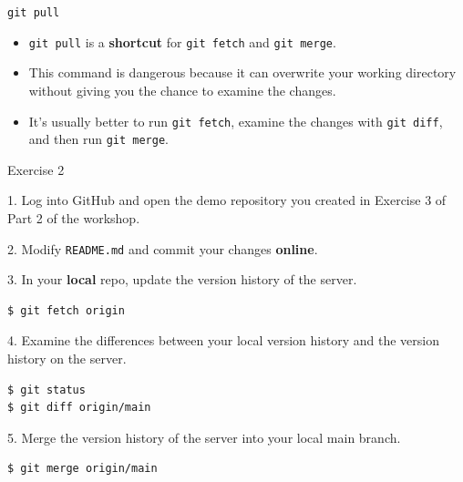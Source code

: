 \documentclass[handout]{beamer}
\begin{document}
\begin{frame}{\texttt{git pull}}
\begin{itemize}
	\item \texttt{git pull} is a \textbf{shortcut} for \texttt{git fetch} and \texttt{git merge}.
	\item This command is \alert{dangerous} because it can overwrite your working directory without giving you the chance to examine the changes. 
	\item It's usually better to run \texttt{git fetch}, examine the changes with \texttt{git diff}, and then run \texttt{git merge}.
\end{itemize}
\end{frame}


\begin{frame}[fragile]{Exercise 2}

1. Log into GitHub and open the demo repository you created in Exercise 3 of Part 2 of the workshop. 

\vspace{0.3cm}

2. Modify \texttt{README.md} and commit your changes \textbf{online}. 

\vspace{0.3cm}

3. In your \textbf{local} repo, update the version history of the server.

\begin{lstlisting}
$ git fetch origin
\end{lstlisting}

4. Examine the differences between your local version history and the version history on the server. 

\begin{lstlisting}
$ git status
$ git diff origin/main
\end{lstlisting}

5. Merge the version history of the server into your local main branch.

\begin{lstlisting}
$ git merge origin/main
\end{lstlisting}
\end{frame}
\end{document}
